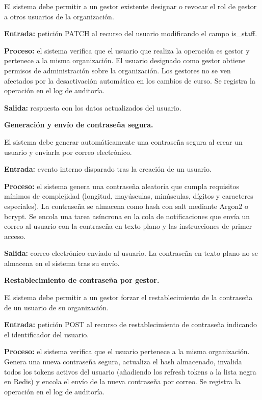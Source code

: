 \begin{functional}
\begin{functional}
    El sistema debe permitir a un gestor existente designar o revocar el rol de gestor a otros usuarios de la organización.

    \textbf{Entrada:} petición PATCH al recurso del usuario modificando el campo is\_staff.

    \textbf{Proceso:} el sistema verifica que el usuario que realiza la operación es gestor y pertenece a la misma organización. El usuario designado como gestor obtiene permisos de administración sobre la organización. Los gestores no se ven afectados por la desactivación automática en los cambios de curso. Se registra la operación en el log de auditoría.

    \textbf{Salida:} respuesta con los datos actualizados del usuario.

    \item \textbf{Generación y envío de contraseña segura.}

    El sistema debe generar automáticamente una contraseña segura al crear un usuario y enviarla por correo electrónico.

    \textbf{Entrada:} evento interno disparado tras la creación de un usuario.

    \textbf{Proceso:} el sistema genera una contraseña aleatoria que cumpla requisitos mínimos de complejidad (longitud, mayúsculas, minúsculas, dígitos y caracteres especiales). La contraseña se almacena como hash con salt mediante Argon2 o bcrypt. Se encola una tarea asíncrona en la cola de notificaciones que envía un correo al usuario con la contraseña en texto plano y las instrucciones de primer acceso.

    \textbf{Salida:} correo electrónico enviado al usuario. La contraseña en texto plano no se almacena en el sistema tras su envío.

    \item \textbf{Restablecimiento de contraseña por gestor.}

    El sistema debe permitir a un gestor forzar el restablecimiento de la contraseña de un usuario de su organización.

    \textbf{Entrada:} petición POST al recurso de restablecimiento de contraseña indicando el identificador del usuario.

    \textbf{Proceso:} el sistema verifica que el usuario pertenece a la misma organización. Genera una nueva contraseña segura, actualiza el hash almacenado, invalida todos los tokens activos del usuario (añadiendo los refresh tokens a la lista negra en Redis) y encola el envío de la nueva contraseña por correo. Se registra la operación en el log de auditoría.


\end{functional}
\end{functional}

